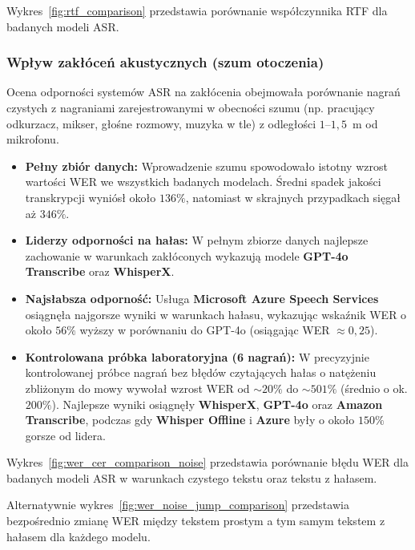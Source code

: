 Wykres~\ref{fig:rtf_comparison} przedstawia porównanie współczynnika RTF dla badanych modeli ASR.





\subsubsection{Wpływ zakłóceń akustycznych (szum otoczenia)}
\label{subsubsec:noise_impact}

Ocena odporności systemów ASR na zakłócenia obejmowała porównanie nagrań czystych z nagraniami zarejestrowanymi w obecności szumu (np. pracujący odkurzacz, mikser, głośne rozmowy, muzyka w tle) z odległości $1$--$1{,}5$~m od mikrofonu.

\begin{itemize}
    \item \textbf{Pełny zbiór danych:} Wprowadzenie szumu spowodowało istotny wzrost wartości WER we wszystkich badanych modelach. Średni spadek jakości transkrypcji wyniósł około $136\%$, natomiast w skrajnych przypadkach sięgał aż $346\%$.
    \item \textbf{Liderzy odporności na hałas:} W pełnym zbiorze danych najlepsze zachowanie w warunkach zakłóconych wykazują modele \textbf{GPT-4o Transcribe} oraz \textbf{WhisperX}.
    \item \textbf{Najsłabsza odporność:} Usługa \textbf{Microsoft Azure Speech Services} osiągnęła najgorsze wyniki w warunkach hałasu, wykazując wskaźnik WER o około $56\%$ wyższy w porównaniu do GPT-4o (osiągając WER $\approx 0{,}25$).
    \item \textbf{Kontrolowana próbka laboratoryjna (6 nagrań):} W precyzyjnie kontrolowanej próbce nagrań bez błędów czytających hałas o natężeniu zbliżonym do mowy wywołał wzrost WER od $\sim 20\%$ do $\sim 501\%$ (średnio o ok. $200\%$). Najlepsze wyniki osiągnęły \textbf{WhisperX}, \textbf{GPT-4o} oraz \textbf{Amazon Transcribe}, podczas gdy \textbf{Whisper Offline} i \textbf{Azure} były o około $150\%$ gorsze od lidera.
\end{itemize}

 
Wykres~\ref{fig:wer_cer_comparison_noise} przedstawia porównanie błędu WER dla badanych modeli ASR w warunkach czystego tekstu oraz tekstu z hałasem.



Alternatywnie wykres~\ref{fig:wer_noise_jump_comparison} przedstawia bezpośrednio zmianę WER między tekstem prostym a tym samym tekstem z hałasem dla każdego modelu.

